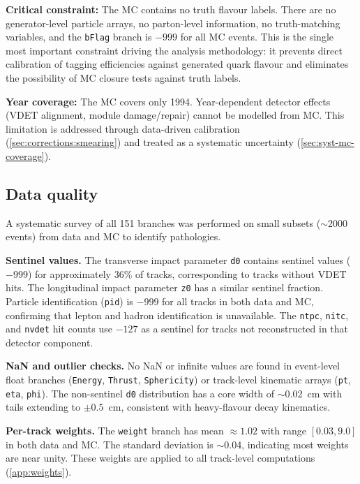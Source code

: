 \documentclass[11pt,a4paper]{article}
\begin{document}
\textbf{Critical constraint:} The MC contains no truth flavour
labels.
There are no generator-level particle arrays, no parton-level
information, no truth-matching variables, and the \texttt{bFlag}
branch is $-999$ for all MC events.
This is the single most important constraint driving the analysis
methodology: it prevents direct calibration of tagging efficiencies
against generated quark flavour and eliminates the possibility of
MC closure tests against truth labels.

\textbf{Year coverage:} The MC covers only 1994.
Year-dependent detector effects (VDET alignment, module
damage/repair) cannot be modelled from MC.
This limitation is addressed through data-driven calibration
(\cref{sec:corrections:smearing}) and treated as a systematic
uncertainty (\cref{sec:syst-mc-coverage}).

\subsection{Data quality}
\label{sec:data:quality}

A systematic survey of all 151 branches was performed on small
subsets ($\sim$2000 events) from data and MC to identify
pathologies.

\textbf{Sentinel values.}
The transverse impact parameter \texttt{d0} contains sentinel
values ($-999$) for approximately 36\% of tracks, corresponding
to tracks without VDET hits.
The longitudinal impact parameter \texttt{z0} has a similar
sentinel fraction.
Particle identification (\texttt{pid}) is $-999$ for all tracks
in both data and MC, confirming that lepton and hadron
identification is unavailable.
The \texttt{ntpc}, \texttt{nitc}, and \texttt{nvdet} hit counts
use $-127$ as a sentinel for tracks not reconstructed in that
detector component.

\textbf{NaN and outlier checks.}
No NaN or infinite values are found in event-level float branches
(\texttt{Energy}, \texttt{Thrust}, \texttt{Sphericity}) or
track-level kinematic arrays (\texttt{pt}, \texttt{eta},
\texttt{phi}).
The non-sentinel \texttt{d0} distribution has a core width of
$\sim$0.02~cm with tails extending to $\pm 0.5$~cm, consistent
with heavy-flavour decay kinematics.

\textbf{Per-track weights.}
The \texttt{weight} branch has mean $\approx 1.02$ with range
$[0.03, 9.0]$ in both data and MC.
The standard deviation is $\sim$0.04, indicating most weights are
near unity.
These weights are applied to all track-level computations
(\cref{app:weights}).
\end{document}

